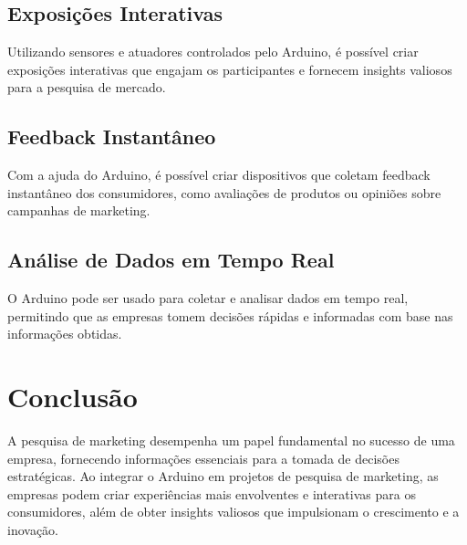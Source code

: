 \documentclass{ufersa}
\begin{document}
\subsection{Exposições Interativas}
Utilizando sensores e atuadores controlados pelo Arduino, é possível criar exposições interativas que engajam os participantes e fornecem insights valiosos para a pesquisa de mercado.

\subsection{Feedback Instantâneo}
Com a ajuda do Arduino, é possível criar dispositivos que coletam feedback instantâneo dos consumidores, como avaliações de produtos ou opiniões sobre campanhas de marketing.

\subsection{Análise de Dados em Tempo Real}
O Arduino pode ser usado para coletar e analisar dados em tempo real, permitindo que as empresas tomem decisões rápidas e informadas com base nas informações obtidas.

\section{Conclusão}
A pesquisa de marketing desempenha um papel fundamental no sucesso de uma empresa, fornecendo informações essenciais para a tomada de decisões estratégicas. Ao integrar o Arduino em projetos de pesquisa de marketing, as empresas podem criar experiências mais envolventes e interativas para os consumidores, além de obter insights valiosos que impulsionam o crescimento e a inovação.
\end{document}
